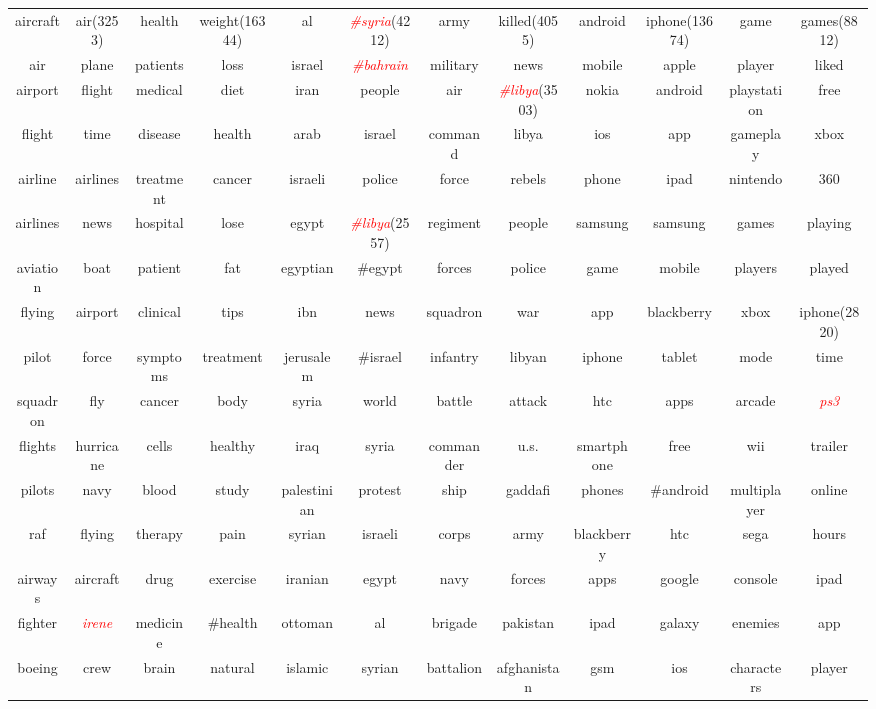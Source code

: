 \documentclass[conference,compsoc]{IEEEtran}
\begin{document}
\begin{table}[ht]
{\begin{tabular}{|cc|cc|cc|cc|cc|cc|}
\hline
aircraft & air\scriptsize(3253) & health & weight\scriptsize(16344) & al & \textcolor{red}{\textit{\#syria}}\scriptsize(4212) & army & killed\scriptsize(4055)  & android & iphone\scriptsize (13674) & game & games\scriptsize(8812) \\ 
air & plane & patients & loss & israel & \textcolor{red}{\textit{\#bahrain}} & military & news & mobile & apple & player & liked \\ 
airport & flight & medical & diet & iran & people & air & \textcolor{red}{\textit{\#libya}}\scriptsize(3503) & nokia & android & playstation & free \\ 
flight & time & disease & health & arab & israel & command & libya & ios & app & gameplay & xbox \\
airline & airlines & treatment & cancer & israeli & police & force & rebels & phone & ipad & nintendo & 360 \\
airlines & news & hospital & lose & egypt & \textcolor{red}{\textit{\#libya}}\scriptsize(2557) & regiment & people & samsung & samsung & games & playing \\
aviation & boat & patient & fat & egyptian & \#egypt & forces & police & game & mobile & players & played \\
flying & airport & clinical & tips & ibn & news & squadron & war & app & blackberry & xbox &iphone\scriptsize(2820)\\
pilot & force & symptoms & treatment & jerusalem & \#israel & infantry & libyan & iphone & tablet & mode & time\\
squadron & fly & cancer & body & syria & world & battle & attack & htc & apps & arcade & \textcolor{red}{\textit{ps3}}\\
flights & hurricane & cells & healthy & iraq & syria & commander & u.s. & smartphone & free & wii & trailer\\
pilots & navy & blood & study & palestinian & protest & ship & gaddafi & phones & \#android & multiplayer & online\\
raf & flying & therapy & pain & syrian & israeli & corps & army & blackberry & htc & sega & hours\\
airways & aircraft & drug & exercise & iranian & egypt & navy & forces & apps & google & console & ipad\\
fighter & \textcolor{red}{\textit{irene}} & medicine & \#health & ottoman & al & brigade & pakistan & ipad & galaxy & enemies & app\\
boeing & crew & brain & natural & islamic & syrian & battalion & afghanistan & gsm & ios & characters & player\\

\end{tabular}}
\end{table}
\end{document}
